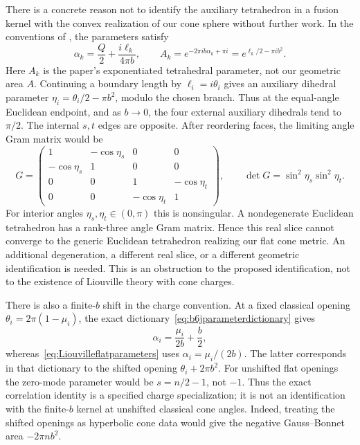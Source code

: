 There is a concrete reason not to identify the auxiliary
tetrahedron in a fusion kernel with the convex realization of
our cone sphere without further work. In the conventions of
\cite[Sections~3--5]{TeschnerVartanov}, the parameters satisfy
\begin{equation}
 \alpha_k=\frac Q2+\frac{i\ell_k}{4\pi b},\qquad
 A_k=e^{-2\pi ib\alpha_k+\pi i}
           =e^{\ell_k/2-\pi ib^2}.
 \label{eq:b6jparameterdictionary}
\end{equation}
Here $A_k$ is the paper's exponentiated tetrahedral parameter,
not our geometric area $A$. Continuing a boundary length by
$\ell_i=i\theta_i$ gives an auxiliary dihedral parameter
$\eta_i=\theta_i/2-\pi b^2$, modulo the chosen branch.
Thus at the equal-angle Euclidean endpoint, and as $b\to0$,
the four external auxiliary dihedrals tend to $\pi/2$.
The internal $s,t$ edges are opposite. After reordering faces,
the limiting angle Gram matrix would be
\begin{equation}
 G=\begin{pmatrix}
 1&-\cos\eta_s&0&0\\
 -\cos\eta_s&1&0&0\\
 0&0&1&-\cos\eta_t\\
 0&0&-\cos\eta_t&1
 \end{pmatrix},\qquad
 \det G=\sin^2\eta_s\sin^2\eta_t.
 \label{eq:auxiliaryGramobstruction}
\end{equation}
For interior angles $\eta_s,\eta_t\in(0,\pi)$ this is
nonsingular. A nondegenerate Euclidean tetrahedron has a
rank-three angle Gram matrix. Hence this real slice cannot
converge to the generic Euclidean tetrahedron realizing our
flat cone metric. An additional degeneration, a different
real slice, or a different geometric identification is needed.
This is an obstruction to the proposed identification, not
to the existence of Liouville theory with cone charges.

There is also a finite-$b$ shift in the charge convention.
At a fixed classical opening $\theta_i=2\pi(1-\mu_i)$, the
exact dictionary~\eqref{eq:b6jparameterdictionary} gives
\[
 \alpha_i=\frac{\mu_i}{2b}+\frac b2,
\]
whereas~\eqref{eq:Liouvilleflatparameters} uses
$\alpha_i=\mu_i/(2b)$. The latter corresponds in that
dictionary to the shifted opening $\theta_i+2\pi b^2$.
For unshifted flat openings the zero-mode parameter would be
$s=n/2-1$, not $-1$. Thus the exact correlation identity is
a specified charge specialization; it is not an identification
with the finite-$b$ kernel at unshifted classical cone angles.
Indeed, treating the shifted openings as hyperbolic cone data
would give the negative Gauss--Bonnet area $-2\pi n b^2$.

